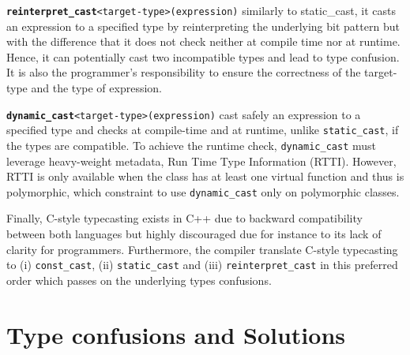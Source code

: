 \documentclass[a4paper,11pt,oneside]{report}
\begin{document}
\texttt{\textbf{reinterpret\_cast}<target-type>(expression)} similarly to static\_cast, it casts an expression to a specified type by reinterpreting the underlying bit pattern but with the difference 
that it does not check neither at compile time nor at runtime. Hence, it can potentially cast two incompatible types and lead to type confusion. 
It is also the programmer's responsibility to ensure the correctness of the target-type and the type of expression.

\texttt{\textbf{dynamic\_cast}<target-type>(expression)} cast safely an expression to a specified type and checks at compile-time and at runtime, unlike \texttt{static\_cast}, if the types are compatible. 
To achieve the runtime check, \texttt{dynamic\_cast} must leverage heavy-weight metadata, Run Time Type Information (RTTI). However, RTTI is only available when the class has at least one virtual function 
and thus is polymorphic, which constraint to use \texttt{dynamic\_cast} only on polymorphic classes.

Finally, C-style typecasting exists in C++ due to backward compatibility between both languages but highly discouraged due for instance to its lack of clarity for programmers. 
Furthermore, the compiler translate C-style typecasting to (i) \texttt{const\_cast}, (ii) \texttt{static\_cast} and (iii) \texttt{reinterpret\_cast} in this preferred order which passes on the underlying types confusions.

\section{Type confusions and Solutions} \label{sec:cpp_solutions}
\end{document}
